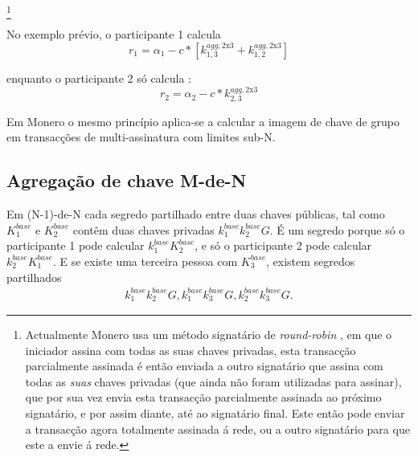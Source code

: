 \footnote{Actualmente Monero usa um método signatário de {\em round-robin} , em que o iniciador assina com todas as suas chaves privadas, esta transacção parcialmente assinada é então enviada a outro signatário que assina com todas as {\em suas} chaves privadas (que ainda não foram utilizadas para assinar), que por sua vez envia esta transacção parcialmente assinada ao próximo signatário, e por assim diante, até ao signatário final. Este então pode enviar a transacção agora totalmente assinada á rede, ou a outro signatário para que este a envie á rede.} 

No exemplo prévio, o participante 1 calcula\vspace{.175cm}
\[r_1 = \alpha_1 - c*[k^{agg,\textrm{2x3}}_{1,3} + k^{agg,\textrm{2x3}}_{1,2}]\] 

enquanto o participante 2 só calcula :
\[r_2 = \alpha_2 - c*k^{agg,\textrm{2x3}}_{2,3}\]

Em Monero o mesmo princípio aplica-se a calcular a imagem de chave de grupo em transacções de multi-assinatura com limites sub-N.



\subsection{Agregação de chave M-de-N}
\label{sec:m-of-n}

Em (N-1)-de-N cada segredo partilhado entre duas chaves públicas, tal como $K^{base}_1$ e $K^{base}_2$ contêm duas chaves privadas $k^{base}_1 k^{base}_2 G$.\newline
É um segredo porque só o participante 1 pode calcular $k^{base}_1 K^{base}_2$, e só o participante 2 pode calcular $k^{base}_2 K^{base}_1$.  
E se existe uma terceira pessoa com $K^{base}_3$, existem segredos partilhados 
\begin{align*}
k^{base}_1 k^{base}_2 G, k^{base}_1 k^{base}_3 G, k^{base}_2 k^{base}_3 G .
\end{align*}

